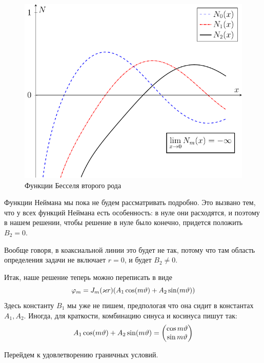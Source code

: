 \begin{figure}[ht]
	\centering
	\includegraphics[scale=1.4]{img_lect5/bessel/besselY012}
	\caption{Функции Бесселя второго рода}
	\label{fig:cylinder:besselN}
\end{figure}
Функции Неймана мы пока не будем рассматривать подробно. Это вызвано тем, что у всех функций Неймана есть особенность: в нуле они расходятся, и поэтому в нашем решении, чтобы решение в нуле было конечно, придется положить $B_2=0$.

Вообще говоря, в коаксиальной линии это будет не так, потому что там область определения задачи не включает $r=0$, и  будет $B_2\ne0$.

Итак, наше решение теперь можно переписать в виде
\begin{equation}
	\varphi_m=J_m(\varkappa r)\qty(A_1\cos(m \vartheta)+A_2\sin(m \vartheta))
\end{equation}
Здесь константу $B_1$ мы уже не пишем, предпологая что она сидит в константах $A_1,A_2$.
Иногда, для краткости, комбинацию синуса и косинуса пишут так:
\begin{equation}
	A_1\cos(m \vartheta)+A_2\sin(m \vartheta)=\mqty(\cos m\vartheta \\\sin m\vartheta)
\end{equation}

Перейдем к удовлетворению граничных условий.

